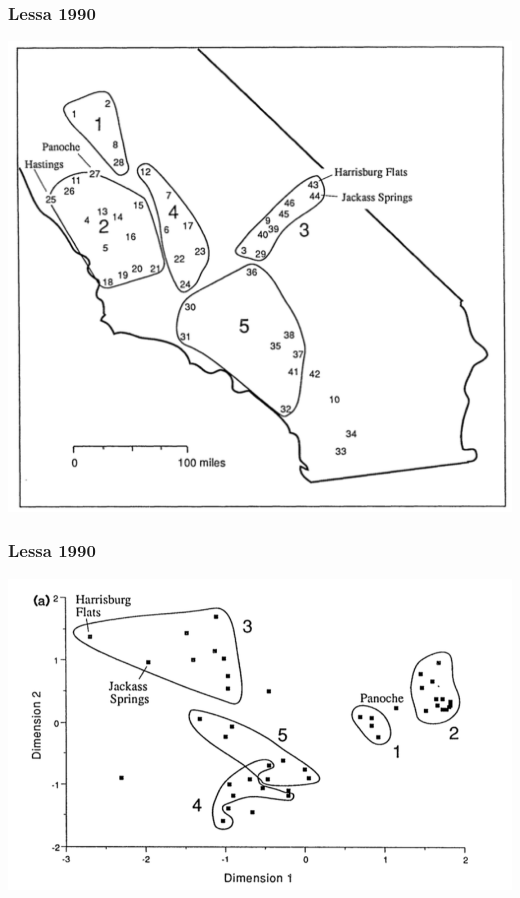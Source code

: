 \documentclass[14pt,handout]{beamer}
\begin{document}
\begin{frame}
\frametitle{Lessa 1990}
\begin{center}
		\includegraphics[width=.7\textwidth]{images_20171102_gg02.png}
\end{center}
\end{frame}

\begin{frame}
\frametitle{Lessa 1990}
\begin{center}
		\includegraphics[width=.9\textwidth]{images_20171102_gg03.png}
\end{center}
\end{frame}
\end{document}
